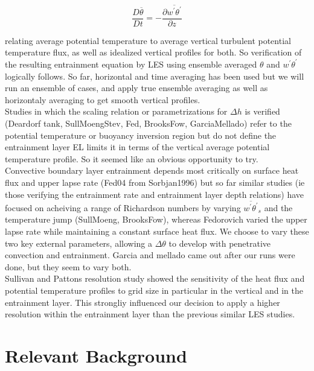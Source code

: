 \begin{equation}
\frac{D \overline{\theta}}{Dt} = -\frac{\partial \overline{w^{'}\theta^{'}}}{\partial z}
\end{equation}

relating average potential temperature to average vertical turbulent potential temperature flux, as well as idealized vertical profiles for both.  So verification of the resulting entrainment equation by LES using ensemble averaged $\theta$ and $w^{'}\theta^{'}$ logically follows.  So far, horizontal and time averaging has been
used but we will run an ensemble of cases, and apply true ensemble averaging as well as horizontaly averaging to get smooth vertical profiles.\\  


Studies in which the scaling relation or parametrizations for $\Delta h$ is verified (Deardorf tank, SullMoengStev, Fed, BrooksFow, GarciaMellado) refer to the potential temperature or buoyancy inversion region but do not define the entrainment layer \acs{EL} limits it in terms of the 
vertical average potential temperature profile.  So it seemed like an obvious opportunity to try.\\

Convective boundary layer entrainment depends most critically on surface heat flux and upper lapse rate (Fed04 from Sorbjan1996) 
but so far similar studies (ie those verifying the entrainment rate and entrainment layer depth relations) have focused on acheiving 
a range of Richardson numbers by varying $\overline{w^{'}\theta^{'}}_{s}$ and the temperature jump (SullMoeng, BrooksFow), whereas Fedorovich varied the upper lapse rate while maintaining a constant surface heat flux.  We choose to vary these two key external parameters, allowing a $\Delta \theta$ to develop with penetrative convection and entrainment.  Garcia and mellado came out after our runs were done, but they seem to vary both. \\

Sullivan and Pattons resolution study showed the sensitivity of the heat flux and potential temperature profiles to grid size in particular in the vertical and in the entrainment layer.  This strongliy influenced our decision to apply a higher resolution within the entrainment layer than the previous similar LES studies.\\ 

\section{Relevant Background}
\label{sec:}

